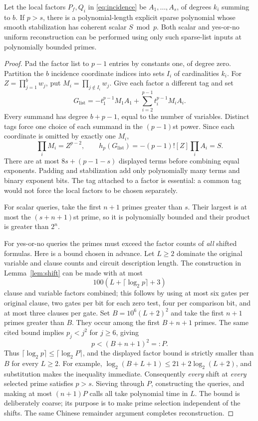 \begin{proposition}\label{prop:sparse-tags}
Let the local factors $P_f,Q_i$ in \eqref{eq:incidence} be $A_1,\ldots,A_s$, of degrees $k_i$ summing to $b$. If $p>s$, there is a polynomial-length explicit sparse polynomial whose smooth stabilization has coherent scalar $S\bmod p$. Both scalar and yes-or-no uniform reconstruction can be performed using only such sparse-list inputs at polynomially bounded primes.
\end{proposition}
\begin{proof}
Pad the factor list to $p-1$ entries by constants one, of degree zero. Partition the $b$ incidence coordinate indices into sets $I_i$ of cardinalities $k_i$. For $Z=\prod_{j=1}^b w_j$, put $M_i=\prod_{j\notin I_i}w_j$. Give each factor a different tag and set
\[
G_{\mathrm{list}}=-t_1^{p-1}M_1A_1+
             \sum_{i=2}^{p-1}t_i^{p-1}M_iA_i.
\]
Every summand has degree $b+p-1$, equal to the number of variables. Distinct tags force one choice of each summand in the $(p-1)$st power. Since each coordinate is omitted by exactly one $M_i$,
\[
\prod_iM_i=Z^{p-2},\qquad
h_p(G_{\mathrm{list}})=-(p-1)![Z]\prod_iA_i=S.
\]
There are at most $8s+(p-1-s)$ displayed terms before combining equal exponents. Padding and stabilization add only polynomially many terms and binary exponent bits. The tag attached to a factor is essential: a common tag would not force the local factors to be chosen separately.

For scalar queries, take the first $n+1$ primes greater than $s$. Their largest is at most the $(s+n+1)$st prime, so it is polynomially bounded and their product is greater than $2^n$.

For yes-or-no queries the primes must exceed the factor counts of \emph{all} shifted formulas. Here is a bound chosen in advance. Let $L\ge2$ dominate the original variable and clause counts and circuit description length. The construction in Lemma~\ref{lem:shift} can be made with at most
\[
100(L+\lceil\log_2p\rceil+3)
\]
clause and variable factors combined; this follows by using at most six gates per original clause, two gates per bit for each zero test, four per comparison bit, and at most three clauses per gate. Set $B=10^6(L+2)^2$ and take the first $n+1$ primes greater than $B$. They occur among the first $B+n+1$ primes. The same cited bound implies $p_j<j^2$ for $j\ge6$, giving
\[
p<(B+n+1)^2=:P.
\]
Thus $\lceil\log_2p\rceil\le\lceil\log_2P\rceil$, and the displayed factor bound is strictly smaller than $B$ for every $L\ge2$. For example, $\log_2(B+L+1)\le21+2\log_2(L+2)$, and substitution makes the inequality immediate. Consequently \emph{every} shift at \emph{every} selected prime satisfies $p>s$. Sieving through $P$, constructing the queries, and making at most $(n+1)P$ calls all take polynomial time in $L$. The bound is deliberately coarse; its purpose is to make prime selection independent of the shifts. The same Chinese remainder argument completes reconstruction.
\end{proof}
